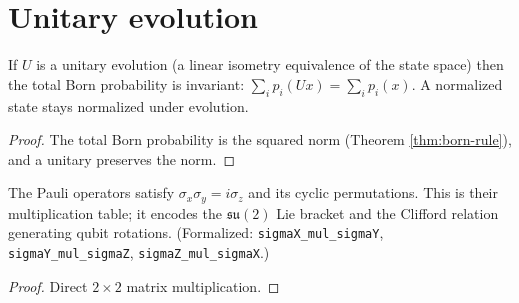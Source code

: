 \section{Unitary evolution}

\begin{theorem}
  \label{thm:probability-conservation}
  \leanok
  If $U$ is a unitary evolution (a linear isometry equivalence of the state space)
  then the total Born probability is invariant: $\sum_i p_i(Ux) = \sum_i p_i(x)$.
  A normalized state stays normalized under evolution.
\end{theorem}
\begin{proof}\leanok
  The total Born probability is the squared norm (Theorem \ref{thm:born-rule}), and
  a unitary preserves the norm.
\end{proof}

\begin{lemma}
  \label{lem:pauli-algebra}
  \leanok
  The Pauli operators satisfy $\sigma_x\sigma_y = i\sigma_z$ and its cyclic
  permutations. This is their multiplication table; it encodes the
  $\mathfrak{su}(2)$ Lie bracket and the Clifford relation generating qubit
  rotations. (Formalized: \texttt{sigmaX\_mul\_sigmaY},
  \texttt{sigmaY\_mul\_sigmaZ}, \texttt{sigmaZ\_mul\_sigmaX}.)
\end{lemma}
\begin{proof}\leanok Direct $2\times2$ matrix multiplication. \end{proof}
